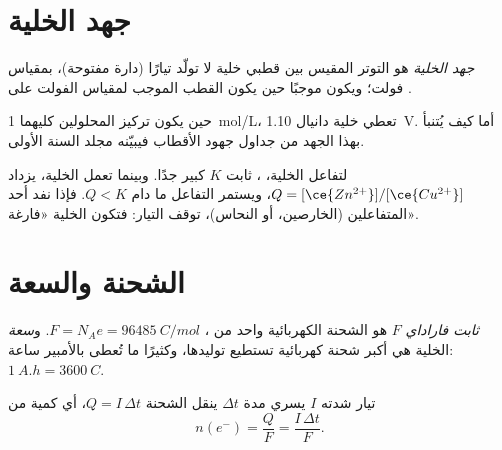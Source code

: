 \section{جهد الخلية}

\begin{definition}\label{def:g12:cells-and-electrolysis:emf}
\emph{جهد الخلية} هو التوتر المقيس
بين قطبي خلية لا تولّد تيارًا (دارة مفتوحة)،
بمقياس فولت؛ ويكون موجبًا حين يكون القطب الموجب لمقياس الفولت
على .
\end{definition}

\begin{example}\label{ex:g12:cells-and-electrolysis:daniell}
حين يكون تركيز المحلولين كليهما \qty{1}{mol/L}، تعطي خلية دانيال
\qty{1.10}{V}. أما كيف يُتنبأ بهذا الجهد من جداول جهود
الأقطاب فيبيّنه مجلد السنة الأولى.
\end{example}

\begin{remark}\label{rem:g12:cells-and-electrolysis:runs-down}
لتفاعل الخلية، ، ثابت $K$ كبير
جدًا. وبينما تعمل الخلية، يزداد $Q = [\ce{Zn^{2+}}]/[\ce{Cu^{2+}}]$،
ويستمر التفاعل ما دام $Q < K$. فإذا نفد
أحد المتفاعلين (الخارصين، أو  النحاس)، توقف التيار: فتكون
الخلية «فارغة».
\end{remark}

\section{الشحنة والسعة}

\begin{definition}\label{def:g12:cells-and-electrolysis:capacity}
\emph{ثابت فاراداي} $F$ هو الشحنة
الكهربائية  واحد من ، $F = N_A e = \qty{96485}{C/mol}$.
و\emph{سعة} الخلية هي أكبر شحنة كهربائية
تستطيع توليدها، وكثيرًا ما تُعطى بالأمبير ساعة: $\qty{1}{A.h} = \qty{3600}{C}$.
\end{definition}

\begin{proposition}\label{prop:g12:cells-and-electrolysis:charge}
تيار شدته $I$ يسري مدة $\Delta t$ ينقل الشحنة
$Q = I\,\Delta t$، أي كمية من 
\[
  n(e^-) = \frac{Q}{F} = \frac{I\,\Delta t}{F} .
\]
\end{proposition}

